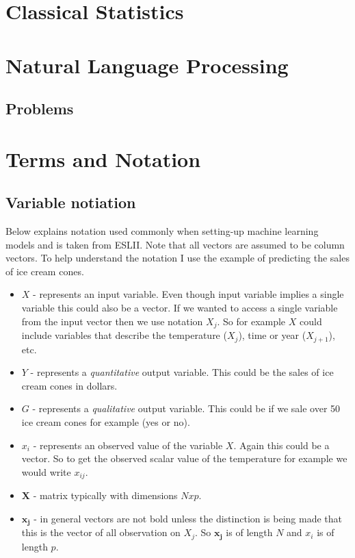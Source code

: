 \documentclass[paper=a4, fontsize=11pt]{scrartcl} %
\numberwithin{equation}{section} %
\numberwithin{figure}{section} %
\numberwithin{table}{section} %
\begin{document}
\section{Classical Statistics}


\section{Natural Language Processing}


\subsection{Problems}


\section{Terms and Notation}

\subsection{Variable notiation}
\label{sec:notation}



Below explains notation used commonly when setting-up machine learning models and is taken from ESLII. Note that all vectors are assumed to be column vectors. To help understand the notation I use the example of predicting the sales of ice cream cones. 
\vspace{2mm}

\begin{itemize}
\item $X$ - represents an input variable. Even though input variable implies a single variable this could also be a vector. If we wanted to access a single variable from the input vector then we use notation $X_j$. So for example $X$ could include variables that describe the temperature ($X_{j}$), time or year ($X_{j+1}$), etc. 
\item $Y$ - represents a \emph{quantitative} output variable. This could be the sales of ice cream cones in dollars.
\item $G$ - represents a \emph{qualitative} output variable. This could be if we sale over 50 ice cream cones for example (yes or no). 
\item $x_i$ - represents an observed value of the variable $X$. Again this could be a vector. So to get the observed scalar value of the temperature for example we would write $x_{ij}$. 
\item $\bm{X}$ - matrix typically with dimensions $Nxp$. 
\item $\bm{x_j}$ -  in general vectors are not bold unless the distinction is being made that this is the vector of all observation on $X_j$. So $\bm{x_j}$ is of length $N$ and $x_i$ is of length $p$.
\end{itemize}
\end{document}
